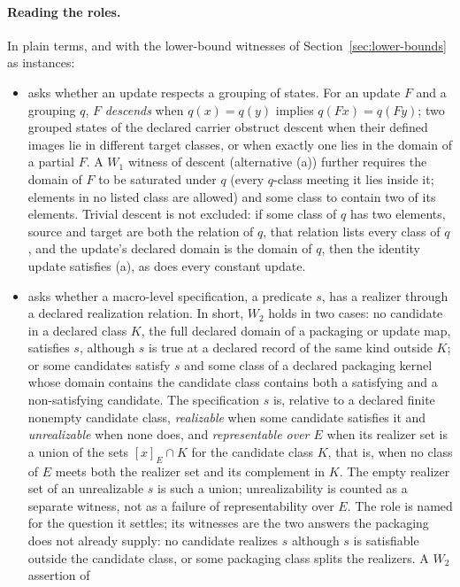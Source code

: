 \paragraph{Reading the roles.} In plain terms, and with the lower-bound
witnesses of Section~\ref{sec:lower-bounds} as instances:
\begin{itemize}[topsep=2pt,itemsep=1pt]
  \item \Pone{} asks whether an update respects a grouping of states. For
    an update \(F\) and a grouping \(q\), \(F\) \emph{descends} when
    \(q(x)=q(y)\) implies \(q(Fx)=q(Fy)\); two grouped states of the declared carrier obstruct descent when their defined images lie in different target classes, or when exactly one lies in the domain of a partial \(F\). A \(W_1\) witness of descent (alternative (a)) further requires the domain of \(F\) to be saturated under \(q\) (every \(q\)-class meeting it lies inside it; elements in no listed class are allowed) and some class to contain two of its elements. Trivial descent is not excluded: if some class of \(q\) has two elements, source and target are both the relation of \(q\), that relation lists every class of \(q\), and the update's declared domain is the domain of \(q\), then the identity update satisfies (a), as does every constant update.
  \item \Ptwo{} asks whether a macro-level specification, a predicate
    \(s\), has a realizer through a declared realization relation. In short, \(W_2\)
    holds in two cases: no candidate in a declared class \(K\), the full
    declared domain of a packaging or update map, satisfies \(s\), although \(s\)
    is true at a declared record of the same kind outside \(K\); or some
    candidates satisfy \(s\) and some class of a declared packaging kernel whose
    domain contains the candidate class contains both a satisfying and a
    non-satisfying candidate. The
    specification \(s\) is, relative to a declared finite nonempty candidate
    class, \emph{realizable} when some candidate satisfies it and
    \emph{unrealizable} when none does, and \emph{representable over \(E\)} when
    its realizer set is a union of the sets \([x]_E\cap K\) for the candidate
    class \(K\), that is, when no class of \(E\) meets both the realizer set and
    its complement in \(K\). The empty realizer set of an
    unrealizable \(s\) is such a union; unrealizability is counted
    as a separate witness, not as a failure of representability over \(E\). The role is named for the question it settles; its witnesses are the two answers the packaging does not already supply: no candidate realizes \(s\) although \(s\) is satisfiable outside the candidate class, or some packaging class splits the realizers. A \(W_2\) assertion of

\end{itemize}
